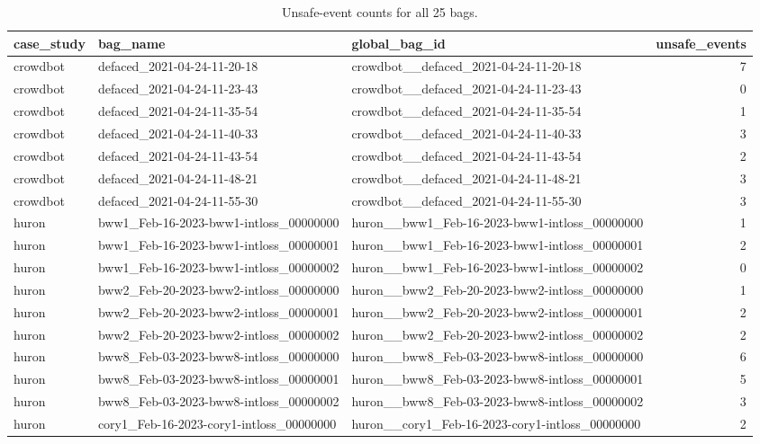 \begin{table}[tbp]
\caption{Unsafe-event counts for all 25 bags.}
\label{tab:rq4-unsafe-events-by-bag}
\begin{tabular}{lllr}
\toprule
case\_study & bag\_name & global\_bag\_id & unsafe\_events \\
\midrule
crowdbot & defaced\_2021-04-24-11-20-18 & crowdbot\_\_defaced\_2021-04-24-11-20-18 & 7 \\
crowdbot & defaced\_2021-04-24-11-23-43 & crowdbot\_\_defaced\_2021-04-24-11-23-43 & 0 \\
crowdbot & defaced\_2021-04-24-11-35-54 & crowdbot\_\_defaced\_2021-04-24-11-35-54 & 1 \\
crowdbot & defaced\_2021-04-24-11-40-33 & crowdbot\_\_defaced\_2021-04-24-11-40-33 & 3 \\
crowdbot & defaced\_2021-04-24-11-43-54 & crowdbot\_\_defaced\_2021-04-24-11-43-54 & 2 \\
crowdbot & defaced\_2021-04-24-11-48-21 & crowdbot\_\_defaced\_2021-04-24-11-48-21 & 3 \\
crowdbot & defaced\_2021-04-24-11-55-30 & crowdbot\_\_defaced\_2021-04-24-11-55-30 & 3 \\
huron & bww1\_Feb-16-2023-bww1-intloss\_00000000 & huron\_\_bww1\_Feb-16-2023-bww1-intloss\_00000000 & 1 \\
huron & bww1\_Feb-16-2023-bww1-intloss\_00000001 & huron\_\_bww1\_Feb-16-2023-bww1-intloss\_00000001 & 2 \\
huron & bww1\_Feb-16-2023-bww1-intloss\_00000002 & huron\_\_bww1\_Feb-16-2023-bww1-intloss\_00000002 & 0 \\
huron & bww2\_Feb-20-2023-bww2-intloss\_00000000 & huron\_\_bww2\_Feb-20-2023-bww2-intloss\_00000000 & 1 \\
huron & bww2\_Feb-20-2023-bww2-intloss\_00000001 & huron\_\_bww2\_Feb-20-2023-bww2-intloss\_00000001 & 2 \\
huron & bww2\_Feb-20-2023-bww2-intloss\_00000002 & huron\_\_bww2\_Feb-20-2023-bww2-intloss\_00000002 & 2 \\
huron & bww8\_Feb-03-2023-bww8-intloss\_00000000 & huron\_\_bww8\_Feb-03-2023-bww8-intloss\_00000000 & 6 \\
huron & bww8\_Feb-03-2023-bww8-intloss\_00000001 & huron\_\_bww8\_Feb-03-2023-bww8-intloss\_00000001 & 5 \\
huron & bww8\_Feb-03-2023-bww8-intloss\_00000002 & huron\_\_bww8\_Feb-03-2023-bww8-intloss\_00000002 & 3 \\
huron & cory1\_Feb-16-2023-cory1-intloss\_00000000 & huron\_\_cory1\_Feb-16-2023-cory1-intloss\_00000000 & 2 \\

\end{tabular}
\end{table}
